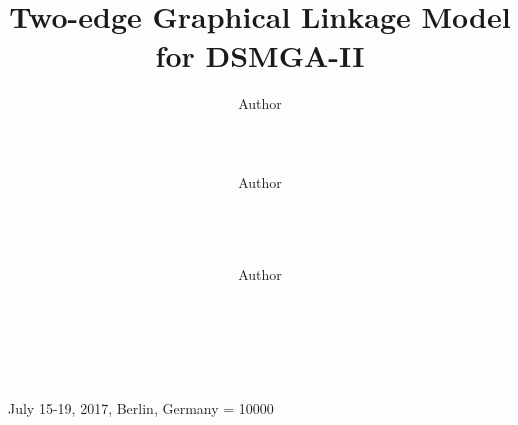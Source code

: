 \documentclass{sig-alternate-05-2015}
\begin{document}

 {July 15-19, 2017, Berlin, Germany}
\widowpenalty = 10000



\title{Two-edge Graphical Linkage Model for DSMGA-II}

\author{
\alignauthor
Author\\
       \\
       \\
       \\
\alignauthor
Author\\
       \\
       \\
       \\
\and  %
\alignauthor
Author\\
       \\
       \\
       \\
}
\end{document}

